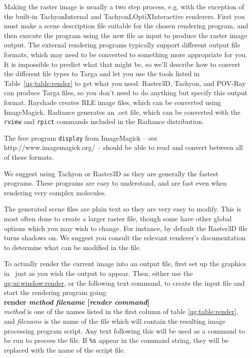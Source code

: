 Making the raster image is usually a two step process, 
e.g. with the exception of the built-in TachyonInternal 
and TachyonLOptiXInteractive renderers.  First you must make
a scene description file suitable for the chosen rendering program, and then
execute the program using the new file as input to produce the raster
image output.  The external rendering programs typically
support different output file formats, which may need to be converted to
something more appropriate for you.  It is impossible to predict what
that might be, so we'll describe how to convert the different file types to
Targa and let you use the tools listed in Table~\ref{ug:table:render}
to get what you need.
Raster3D, Tachyon, and POV-Ray can produce Targa files, so you don't need 
to do anything but specify this output format.  
Rayshade creates RLE image files, which can be converted using ImageMagick.
Radiance generates an .oct file, which can be converted with the 
{\tt rview} and {\tt rpict} commands included in the Radiance distribution.

The free program {\tt display} from ImageMagick -- see   {http://www.imagemagick.org/} -- should be able
to read and convert between all of these formats.

We suggest using Tachyon or Raster3D as they are 
generally the fastest programs.  These programs are easy to 
understand, and are fast even when rendering very complex molecules.

The generated scene files are plain text so they are very easy to modify.  
This is most often done to create a larger raster
file, though some have other global options which you may wish to
change.  For instance, by default the Raster3D file turns shadows on.
We suggest you consult the relevant renderer's documentation to determine 
what can be modified in the file.

To actually render the current image into an output file, first set up
the graphics in \VMD\ just as you wish the output to appear.  Then,
either use the \hyperref{Render window}{Render window 
[\S~}{]}{ug:ui:window:render}, or the following text command, to create
the input file and start the rendering program going:
\vspace{0.1in}
\\
{\bf render {\em method} {\em filename} [{\em render command}]}
\vspace{0.1in}
\\
{\em method} is one of the names listed in the first column of table
\ref{ug:table:render}, and {\em filename} is the name of the file which
will contain the resulting image processing program script.  Any text
following this will be used as a command to be run to process the file.
If {\tt \%s} appear in the command string, they will be replaced with the
name of the script file.

